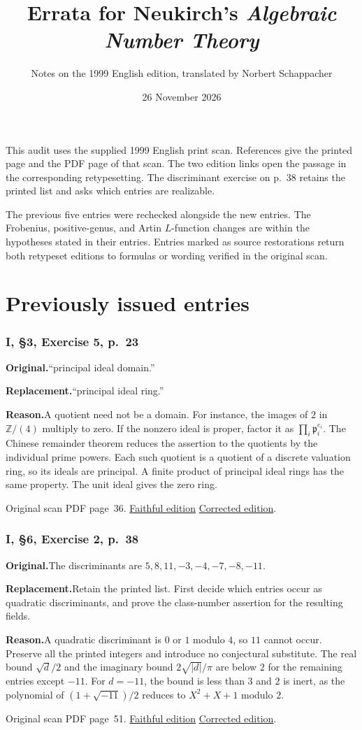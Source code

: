 \documentclass[11pt,a4paper]{article}
\title{Errata for Neukirch's \textit{Algebraic Number Theory}}
\author{Notes on the 1999 English edition, translated by Norbert Schappacher}
\date{26 November 2026}
\newcommand{\original}{\par\smallskip\noindent\textbf{Original.}\enspace}
\newcommand{\replacement}{\par\smallskip\noindent\textbf{Replacement.}\enspace}
\newcommand{\reason}{\par\smallskip\noindent\textbf{Reason.}\enspace}
\newcommand{\editionlink}[3]{\href{#1\#errata.#2}{#3}}
\newcommand{\location}[2]{%
  \par\smallskip\noindent Original scan PDF page~#2.\enspace
  \editionlink{Neukirch_Faithful.pdf}{#1}{Faithful edition}
  \quad\editionlink{Neukirch_Corrected.pdf}{#1}{Corrected edition}.}
\begin{document}
\maketitle
\tableofcontents
\clearpage

\noindent This audit uses the supplied 1999 English print scan. References give the printed page and the PDF page of that scan. The two edition links open the passage in the corresponding retypesetting. The discriminant exercise on p.~38 retains the printed list and asks which entries are realizable.
\par\smallskip
\noindent The previous five entries were rechecked alongside the new entries. The Frobenius, positive-genus, and Artin $L$-function changes are within the hypotheses stated in their entries. Entries marked as source restorations return both retypeset editions to formulas or wording verified in the original scan.
\part{Previously issued entries}
\setcounter{section}{0}
\section{I, \S3, Exercise 5, p.~23}\label{errata:item:1}
\original ``principal ideal domain.''
\replacement ``principal ideal ring.''
\reason A quotient need not be a domain. For instance, the images of $2$ in $\mathbb Z/(4)$ multiply to zero. If the nonzero ideal is proper, factor it as $\prod_i\mathfrak p_i^{e_i}$. The Chinese remainder theorem reduces the assertion to the quotients by the individual prime powers. Each such quotient is a quotient of a discrete valuation ring, so its ideals are principal. A finite product of principal ideal rings has the same property. The unit ideal gives the zero ring.
\location{1}{36}

\setcounter{section}{1}
\section{I, \S6, Exercise 2, p.~38}\label{errata:item:2}
\original The discriminants are $5,8,11,-3,-4,-7,-8,-11$.
\replacement Retain the printed list. First decide which entries occur as quadratic discriminants, and prove the class-number assertion for the resulting fields.
\reason A quadratic discriminant is $0$ or $1$ modulo $4$, so $11$ cannot occur. Preserve all the printed integers and introduce no conjectural substitute. The real bound $\sqrt d/2$ and the imaginary bound $2\sqrt{|d|}/\pi$ are below $2$ for the remaining entries except $-11$. For $d=-11$, the bound is less than $3$ and $2$ is inert, as the polynomial of $(1+\sqrt{-11})/2$ reduces to $X^2+X+1$ modulo $2$.
\location{2}{51}
\end{document}
